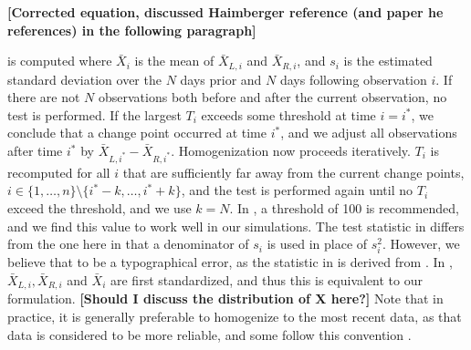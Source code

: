 \documentclass[12pt]{article}
\def\ni{\noindent}
\begin{document}
\begin{doublespacing}
\textbf{[Corrected equation, discussed Haimberger reference (and paper he references) in the following paragraph]}

\ni is computed where $\bar{X}_i$ is the mean of $\bar{X}_{L,i}$ and $\bar{X}_{R,i}$, and $s_i$ is the estimated standard deviation over the $N$ days prior and $N$ days following observation $i$.  If there are not $N$ observations both before and after the current observation, no test is performed.  If the largest $T_i$ exceeds some threshold at time $i=i^*$, we conclude that a change point occurred at time $i^*$, and we adjust all observations after time $i^*$ by $\bar{X}_{L,i^*}-\bar{X}_{R,i^*}$.  Homogenization now proceeds iteratively.  $T_i$ is recomputed for all $i$ that are sufficiently far away from the current change points, $i\in\{1,\ldots,n\} \setminus \{i^*-k, \ldots, i^*+k\}$, and the test is performed again until no $T_i$ exceed the threshold, and we use $k=N$.  In \cite{haimberger07}, a threshold of 100 is recommended, and we find this value to work well in our simulations.  The test statistic in \cite{haimberger07} differs from the one here in that a denominator of $s_i$ is used in place of $s_i^2$.  However, we believe that to be a typographical error, as the statistic in \cite{haimberger07} is derived from \cite{alexandersson86}.  In \cite{alexandersson86}, $\bar{X}_{L,i}, \bar{X}_{R,i}$ and $\bar{X}_{i}$ are first standardized, and thus this is equivalent to our formulation.  \textbf{[Should I discuss the distribution of X here?]} Note that in practice, it is generally preferable to homogenize to the most recent data, as that data is considered to be more reliable, and some follow this convention \cite{domonkos13}. %


\end{doublespacing}
\end{document}
